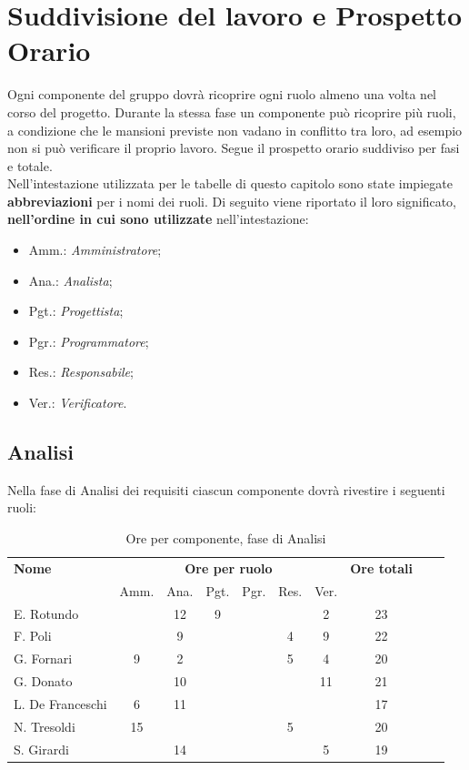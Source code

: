 \section{Suddivisione del lavoro e Prospetto Orario} 


Ogni componente del gruppo dovrà ricoprire ogni ruolo almeno una volta nel corso del progetto.
Durante la stessa fase un componente può ricoprire più ruoli, a condizione che le mansioni previste non vadano in conflitto tra loro, ad esempio non si può verificare il proprio lavoro.
Segue il prospetto orario suddiviso per fasi e totale. \\

Nell'intestazione utilizzata per le tabelle di questo capitolo sono state impiegate \textbf{abbreviazioni} per i nomi dei ruoli.
Di seguito viene riportato il loro significato, \textbf{nell'ordine in cui sono utilizzate} nell'intestazione:
\begin{itemize}
\item Amm.: \textit{Amministratore};
\item Ana.: \textit{Analista};
\item Pgt.: \textit{Progettista};
\item Pgr.: \textit{Programmatore};
\item Res.: \textit{Responsabile};
\item Ver.: \textit{Verificatore}.
\end{itemize}

\pagebreak
\subsection{Analisi}

Nella fase di Analisi dei requisiti ciascun componente dovrà rivestire i seguenti ruoli:
\noindent
\begin{table}[H]
\begin{tabular}{lccccccccc}
\toprule
    \textbf{Nome}  & \multicolumn{6}{c}{\textbf{Ore per ruolo}} & \textbf{Ore totali} \\
     & Amm. & Ana. & Pgt. & Pgr. & Res. & Ver. \\
    \midrule
    E. Rotundo 		&   & 12 & 9 &  &  & 2 & 23 \\
    F. Poli 		&   & 9 &  &  & 4 & 9 & 22 \\
    G. Fornari		& 9 & 2 & 	&  & 5 & 4 & 20 \\
    G. Donato 		&   & 10 &  &  &  & 11 & 21 \\
    L. De Franceschi  & 6 & 11 &  &  &  &  & 17 \\
    N. Tresoldi 		& 15&  &  &  & 5 &  & 20 \\
   	S. Girardi 		&   & 14 &  &  &  & 5 & 19 \\
    
    \bottomrule
\end{tabular}
\caption{Ore per componente, fase di Analisi}
\end{table}

